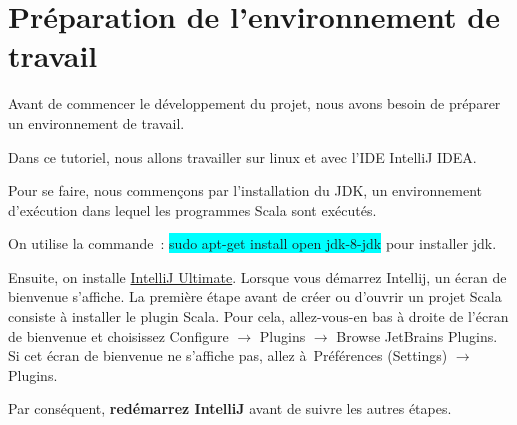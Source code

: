 \documentclass[12pt]{article}
\begin{document}

\newpage

\vspace{\baselineskip}\section{Préparation de l’environnement de travail}

\vspace{\baselineskip}
\begin{justify}
Avant de commencer le développement du projet, nous avons besoin de préparer un environnement de travail.
\end{justify}\par

\begin{justify}
Dans ce tutoriel, nous allons travailler sur linux et avec l’IDE IntelliJ IDEA.
\end{justify}\par

\begin{justify}
Pour se faire, nous commençons par l’installation du JDK, un environnement d'exécution dans lequel les programmes Scala sont exécutés.
\end{justify}\par

\begin{justify}
On utilise la commande : \colorbox{Cyan}{sudo apt-get install open jdk-8-jdk} pour installer jdk.
\end{justify}\par

\begin{justify}
Ensuite, on installe \href{https://www.jetbrains.com/idea/download/}{IntelliJ Ultimate}. Lorsque vous démarrez Intellij, un écran de bienvenue s’affiche. La première étape avant de créer ou d’ouvrir un projet Scala consiste à installer le plugin Scala. Pour cela, allez-vous-en bas à droite de l'écran de bienvenue et choisissez \textcolor[HTML]{373A3C}{Configure $ \rightarrow $  Plugins $ \rightarrow $  Browse JetBrains Plugins. }Si cet écran de bienvenue ne s'affiche pas, allez à\textcolor[HTML]{373A3C}{ Préférences (Settings) $ \rightarrow $  Plugins.}
\end{justify}\par

\begin{justify}
Par conséquent, \textbf{redémarrez IntelliJ} avant de suivre les autres étapes.
\end{justify}\par
\end{document}
